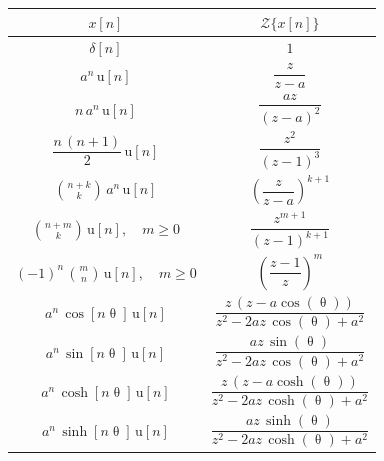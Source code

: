 \begin{center}
    {\tabulinesep=1.2mm
    \begin{tabu}{|c|c|} 
    \hline
    $x[n]$ & $\mathcal{Z}\{x[n]\}$ \\
    \hline \hline
    $\delta[n]$ & $1$ \\
    \hline
    $a^n \, \mathrm{u}[n]$ & $\dfrac{z}{z-a}$ \\
    \hline
    $n \, a^n \, \mathrm{u}[n]$ & $\dfrac{az}{(z-a)^2}$ \\
    \hline 
    $\dfrac{n \, (n+1)}{2} \, \mathrm{u}[n]$ & $\dfrac{z^2}{(z-1)^3}$ \\
    \hline
    $\binom{n+k}{k} \, a^n \, \mathrm{u}[n]$ & $\left(\dfrac{z}{z-a}\right)^{k+1}$ \\
    \hline
    $\binom{n+m}{k} \, \mathrm{u}[n], \quad m \ge 0$ & $\dfrac{z^{m+1}}{(z-1)^{k+1}}$ \\
    \hline
    $(-1)^n \, \binom{m}{n} \, \mathrm{u}[n], \quad m \ge 0$ & $\left(\dfrac{z-1}{z}\right)^m$ \\
    \hline
    $a^n \, \cos[n \uptheta] \, \mathrm{u}[n]$ & $\dfrac{z \, (z - a \cos(\uptheta))}{z^2 - 2 az \, \cos(\uptheta) + a^2}$ \\
    \hline
    $a^n \, \sin[n \uptheta] \, \mathrm{u}[n]$ & $\dfrac{az \, \sin (\uptheta)}{z^2 - 2 az \, \cos(\uptheta) + a^2}$ \\
    \hline
    $a^n \, \cosh[n \uptheta] \, \mathrm{u}[n]$ & $\dfrac{z \, (z - a \cosh(\uptheta))}{z^2 - 2 az \, \cosh(\uptheta) + a^2}$ \\
    \hline
    $a^n \, \sinh[n \uptheta] \, \mathrm{u}[n]$ & $\dfrac{az \, \sinh (\uptheta)}{z^2 - 2 az \, \cosh(\uptheta) + a^2}$ \\ 
    \hline
    \end{tabu} 
    }
\end{center}